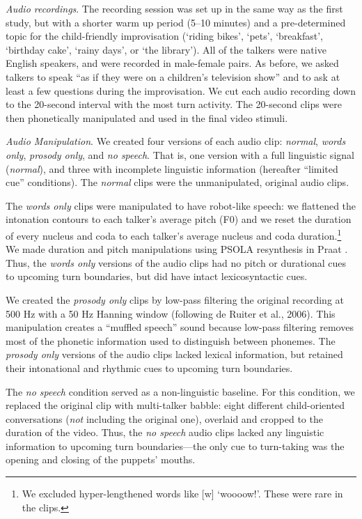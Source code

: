 \documentclass[authoryear, 12pt]{elsarticle}
\begin{document}
\textit{Audio recordings}. The recording session was set up in the same way as the first study, but with a shorter warm up period (5--10 minutes) and a pre-determined topic for the child-friendly improvisation (`riding bikes', `pets', `breakfast', `birthday cake', `rainy days', or `the library'). All of the talkers were native English speakers, and were recorded in male-female pairs. As before, we asked talkers to speak ``as if they were on a children's television show'' and to ask at least a few questions during the improvisation. We cut each audio recording down to the 20-second interval with the most turn activity. The 20-second clips were then phonetically manipulated and used in the final video stimuli.

\textit{Audio Manipulation}. We created four versions of each audio clip: \textit{normal}, \textit{words only}, \textit{prosody only}, and \textit{no speech}. That is, one version with a full linguistic signal (\textit{normal}), and three with incomplete linguistic information (hereafter ``limited cue'' conditions). The \textit{normal} clips were the unmanipulated, original audio clips. 

The \textit{words only} clips were manipulated to have robot-like speech: we flattened the intonation contours to each talker's average pitch (F0) and we reset the duration of every nucleus and coda to each talker's average nucleus and coda duration.\footnote{We excluded hyper-lengthened words like [w] `woooow!'. These were rare in the clips.} We made duration and pitch manipulations using PSOLA resynthesis in Praat \citep{Praat}. Thus, the \textit{words only} versions of the audio clips had no pitch or durational cues to upcoming turn boundaries, but did have intact lexicosyntactic cues. 

We created the \textit{prosody only} clips by low-pass filtering the original recording at 500 Hz with a 50 Hz Hanning window (following de Ruiter et al., 2006). This manipulation creates a ``muffled speech'' sound because low-pass filtering removes most of the phonetic information used to distinguish between phonemes. The \textit{prosody only} versions of the audio clips lacked lexical information, but retained their intonational and rhythmic cues to upcoming turn boundaries. 

The \textit{no speech} condition served as a non-linguistic baseline. For this condition, we replaced the original clip with multi-talker babble: eight different child-oriented conversations (\textit{not} including the original one), overlaid and cropped to the duration of the video. Thus, the \textit{no speech} audio clips lacked any linguistic information to upcoming turn boundaries---the only cue to turn-taking was the opening and closing of the puppets' mouths. 
\end{document}
